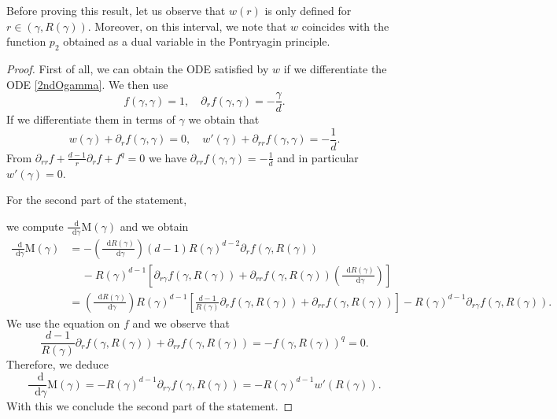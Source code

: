 \documentclass[11pt,a4paper]{article}
\numberwithin{equation}{section}
\theoremstyle{plain}
\theoremstyle{remark}
\newcommand{\diff}{\mathop{}\!\mathrm{d}}
\begin{document}
Before proving this result, let us observe that $w(r)$ is only defined for $r \in (\gamma , R(\gamma))$. Moreover, on this interval, we note that $w$ coincides with the function $p_2$ obtained as a dual variable in the Pontryagin principle.

\begin{proof}
First of all, we can obtain the ODE satisfied by $w$ if we differentiate the ODE  \eqref{2ndOgamma}.  We then use
$$
    f(\gamma,\gamma)=1,\quad \partial_r f (\gamma,\gamma)=-\frac\gamma d.
$$
If we differentiate them in terms of $\gamma$ we obtain that  
$$
    w(\gamma)+ \partial_r f (\gamma,\gamma)=0,\quad w'(\gamma) + \partial_{rr} f (\gamma,\gamma) = -\frac 1d.
$$
From $\partial_{rr} f + \frac{d-1}{r} \partial_r f + f^q = 0$ we have $\partial_{rr} f (\gamma,\gamma) =  -\frac{1}{d}$ and in particular $w'(\gamma)=0$.

For the second part of the statement, 
%
%

% 
we  compute  $\frac{\diff}{\diff \gamma} \mathrm{M}(\gamma)$ and we obtain 
\begin{align*}
    \frac{\diff}{\diff \gamma} \mathrm{M}(\gamma)& =- \left( \frac{\diff R(\gamma)}{\diff \gamma} \right) (d-1)R(\gamma)^{d-2} \partial_r f (\gamma,R(\gamma)) \\
    & \quad \, -  R(\gamma)^{d-1} \left[ \partial_{r \gamma} f (\gamma,R(\gamma)) + \partial_{rr} f (\gamma, R(\gamma)) \left( \frac{\diff R(\gamma)}{\diff \gamma} \right) \right]
    \\ &= \left( \frac{\diff R(\gamma)}{\diff \gamma} \right) R(\gamma)^{d-1} \left[ \frac{d-1}{R(\gamma)} \partial_r f (\gamma,R(\gamma)) + \partial_{rr} f (\gamma,R(\gamma)) \right] - R(\gamma)^{d-1} \partial_{r \gamma} f (\gamma,R(\gamma)).
\end{align*}
We use the equation on $f$ and we observe that
$$
    \frac{d-1}{R(\gamma)} \partial_r f (\gamma,R(\gamma)) + \partial_{rr} f (\gamma,R(\gamma))= -f(\gamma,R(\gamma))^q = 0.
$$
Therefore, we deduce
$$
    \frac{\diff}{\diff \gamma} \mathrm{M}(\gamma)= -  R(\gamma)^{d-1} \partial_{r \gamma} f (\gamma,R(\gamma))=-  R(\gamma)^{d-1} w'(R(\gamma)).
$$
With this we conclude the second part of the statement.
\end{proof}
\end{document}
